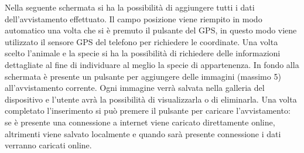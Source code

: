 \documentclass[a4paper,final,12pt]{report}
\begin{document}
Nella seguente schermata si ha la possibilità di aggiungere tutti i dati dell'avvistamento effettuato. Il campo posizione viene riempito in modo automatico una volta che si è premuto il pulsante del GPS, in questo modo viene utilizzato il sensore GPS del telefono per richiedere le coordinate. Una volta scelto l'animale e la specie si ha la possibilità di richiedere delle informazioni dettagliate al fine di individuare al meglio la specie di appartenenza. In fondo alla schermata è presente un pulsante per aggiungere delle immagini (massimo 5) all'avvistamento corrente. Ogni immagine verrà salvata nella galleria del dispositivo e l'utente avrà la possibilità di visualizzarla o di eliminarla. Una volta completato l'inserimento si può premere il pulsante per caricare l'avvistamento: se è presente una connessione a internet viene caricato direttamente online, altrimenti viene salvato localmente e quando sarà presente connessione i dati verranno caricati online.

\newpage
\end{document}
